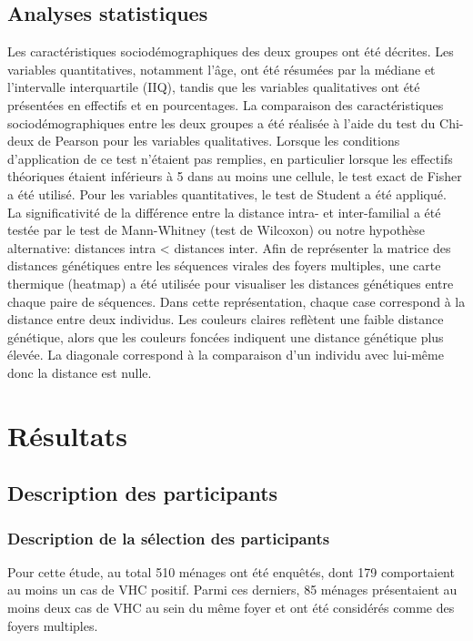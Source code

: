 \documentclass[a4paper,12pt]{article}
\begin{document}
\subsection {Analyses statistiques}

Les caractéristiques sociodémographiques des deux groupes ont été décrites. Les variables quantitatives, notamment l’âge, ont été résumées par la médiane et l’intervalle interquartile (IIQ), tandis que les variables qualitatives ont été présentées en effectifs et en pourcentages. La comparaison des caractéristiques sociodémographiques entre les deux groupes a été réalisée à l’aide du test du Chi-deux de Pearson pour les variables qualitatives. Lorsque les conditions d’application de ce test n’étaient pas remplies, en particulier lorsque les effectifs théoriques étaient inférieurs à 5 dans au moins une cellule, le test exact de Fisher a été utilisé. Pour les variables quantitatives, le test de Student a été appliqué.\\


La significativité de la différence entre la distance intra- et inter-familial a été testée par le test de Mann-Whitney (test de Wilcoxon) ou notre hypothèse alternative: distances intra < distances inter.  Afin de représenter la matrice des distances génétiques entre les séquences virales des foyers multiples, une carte thermique (heatmap) a été utilisée pour visualiser les distances génétiques entre chaque paire de séquences. Dans cette représentation, chaque case correspond à la distance entre deux individus. Les couleurs claires reflètent une faible distance génétique, alors que les couleurs foncées indiquent une distance génétique plus élevée. La diagonale correspond à la comparaison d'un individu avec lui-même donc la distance est nulle. 


\newpage 
\section{Résultats }

\subsection{Description des participants}


\subsubsection{Description de la sélection des participants}

Pour cette étude, au total 510 ménages ont été enquêtés, dont 179 comportaient au moins un cas de VHC positif. Parmi ces derniers, 85 ménages présentaient au moins deux cas de VHC au sein du même foyer et ont été considérés comme des foyers multiples. \\
\end{document}
